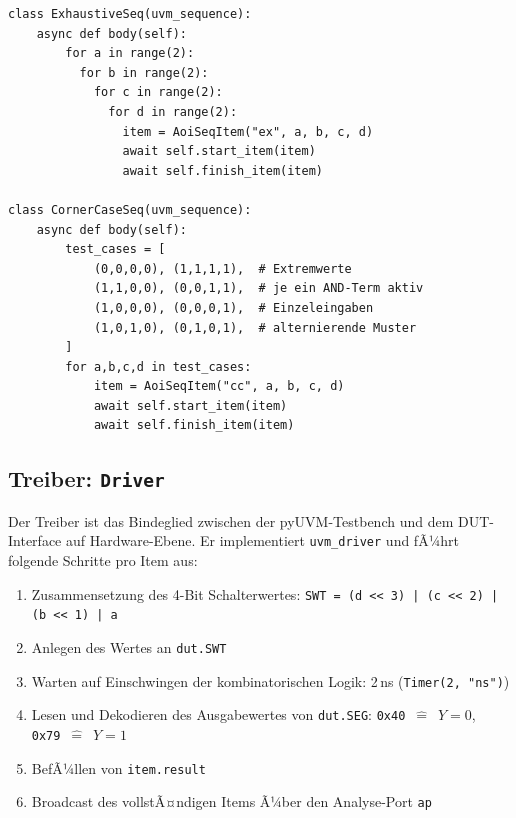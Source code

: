 ﻿\documentclass[12pt,a4paper]{report}
\begin{document}
\begin{lstlisting}[style=pythonstyle, caption={\texttt{ExhaustiveSeq} und \texttt{CornerCaseSeq}}]
class ExhaustiveSeq(uvm_sequence):
    async def body(self):
        for a in range(2):
          for b in range(2):
            for c in range(2):
              for d in range(2):
                item = AoiSeqItem("ex", a, b, c, d)
                await self.start_item(item)
                await self.finish_item(item)

class CornerCaseSeq(uvm_sequence):
    async def body(self):
        test_cases = [
            (0,0,0,0), (1,1,1,1),  # Extremwerte
            (1,1,0,0), (0,0,1,1),  # je ein AND-Term aktiv
            (1,0,0,0), (0,0,0,1),  # Einzeleingaben
            (1,0,1,0), (0,1,0,1),  # alternierende Muster
        ]
        for a,b,c,d in test_cases:
            item = AoiSeqItem("cc", a, b, c, d)
            await self.start_item(item)
            await self.finish_item(item)
\end{lstlisting}

\subsection{Treiber: \texttt{Driver}}
\label{sssec:driver}

Der Treiber ist das Bindeglied zwischen der pyUVM-Testbench und dem
DUT-Interface auf Hardware-Ebene. Er implementiert
\texttt{uvm\_driver} und fÃ¼hrt folgende Schritte pro Item aus:

\begin{enumerate}
    \item Zusammensetzung des 4-Bit Schalterwertes:
          \texttt{SWT = (d << 3) | (c << 2) | (b << 1) | a}
    \item Anlegen des Wertes an \texttt{dut.SWT}
    \item Warten auf Einschwingen der kombinatorischen Logik: 2\,ns (\texttt{Timer(2, "ns")})
    \item Lesen und Dekodieren des Ausgabewertes von \texttt{dut.SEG}:
          \texttt{0x40}~$\widehat{=}$~$Y=0$, \texttt{0x79}~$\widehat{=}$~$Y=1$
    \item BefÃ¼llen von \texttt{item.result}
    \item Broadcast des vollstÃ¤ndigen Items Ã¼ber den Analyse-Port \texttt{ap}
\end{enumerate}
\end{document}
